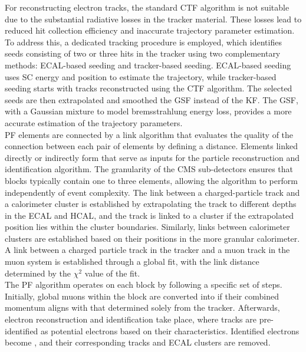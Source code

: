 For reconstructing electron tracks, the standard \ac{CTF} algorithm is not suitable due to the substantial radiative losses in the tracker material. 
These losses lead to reduced hit collection efficiency and inaccurate trajectory parameter estimation. 
To address this, a dedicated tracking procedure is employed, which identifies seeds consisting of two or three hits in the tracker using two complementary methods: \ac{ECAL}-based seeding and tracker-based seeding. 
\ac{ECAL}-based seeding uses \ac{SC} energy and position to estimate the trajectory, while tracker-based seeding starts with tracks reconstructed using the \ac{CTF} algorithm.
The selected seeds are then extrapolated and smoothed the \ac{GSF} instead of the \ac{KF}. 
The \ac{GSF}, with a Gaussian mixture to model bremsstrahlung energy loss, provides a more accurate estimation of the trajectory parameters. \\

\ac{PF} elements are connected by a link algorithm that evaluates the quality of the connection between each pair of elements by defining a distance.
Elements linked directly or indirectly form  that serve as inputs for the particle reconstruction and identification algorithm. 
The granularity of the \ac{CMS} sub-detectors ensures that blocks typically contain one to three elements, allowing the algorithm to perform independently of event complexity. 
The link between a charged-particle track and a calorimeter cluster is established by extrapolating the track to different depths in the \ac{ECAL} and \ac{HCAL}, and the track is linked to a cluster if the extrapolated position lies within the cluster boundaries. 
Similarly, links between calorimeter clusters are established based on their positions in the more granular calorimeter. 
A link between a charged particle track in the tracker and a muon track in the muon system is established through a global fit, with the link distance determined by the $\chi^2$ value of the fit. \\

The \ac{PF} algorithm operates on each block by following a specific set of steps. 
Initially, global muons within the block are converted into  if their combined momentum aligns with that determined solely from the tracker. 
Afterwards, electron reconstruction and identification take place, where tracks are pre-identified as potential electrons based on their characteristics. 
Identified electrons become , and their corresponding tracks and \ac{ECAL} clusters are removed. \\

